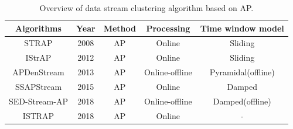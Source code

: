 \documentclass[../UNBThesis2.tex]{subfiles}
\begin{document}
\begin{table}[!h]
    \centering
    \caption{Overview of data stream clustering algorithm based on AP. }
    \label{APCLU}
    \small
    \begin{tabular}{c c c c c}
    \hline
      \textbf{Algorithms} & \textbf{Year} & \textbf{ Method } & \textbf{Processing} & \textbf{Time window model}\\
     \hline \midrule
     STRAP                &   2008        &    AP             &    Online          & Sliding \\
     \hline 
     IStrAP               &   2012        &    AP             &    Online          & Sliding \\
    \hline
     APDenStream          &   2013        &    AP             &     Online-offline & Pyramidal(offline)   \\
     \hline
     SSAPStream           &   2015        &    AP             &     Online         &   Damped    \\
    \hline
     SED-Stream-AP        &   2018        &    AP             &    Online-offline   & Damped(offline)\\
     \hline
     ISTRAP               &   2018        &    AP             &   Online           & - \\
\bottomrule
    \end{tabular}
\end{table}
\end{document}
